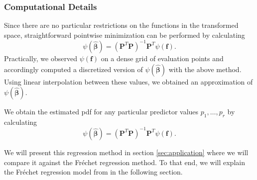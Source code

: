 \subsubsection{Computational Details}
\label{sec:com_details_func_reg}
Since there are no particular restrictions on the functions in the transformed space,
straightforward pointwise minimization can be performed by calculating
\begin{equation}
    \psi(\hat{\boldsymbol{\beta}})
    = \left(\mathbf{P}^T \mathbf{P}\right)^{-1} \mathbf{P}^T \psi(\mathbf{f}).
\end{equation}
Practically, we observed $\psi(\mathbf{f})$ on a dense grid of evaluation points and
accordingly computed a discretized version of $\psi(\hat{\boldsymbol{\beta}})$ with the
above method. Using linear interpolation between these values, we obtained an approximation
of $\psi(\hat{\boldsymbol{\beta}})$.

We obtain the estimated pdf for any particular predictor values $p_1, \dots, p_r$ by
calculating
\begin{equation}
    \psi(\hat{\boldsymbol{\beta}})
    = \left(\mathbf{P}^T \mathbf{P}\right)^{-1} \mathbf{P}^T \psi(\mathbf{f}).
\end{equation}

We will present this regression method in section \ref{sec:application} where we will
compare it against the Fréchet regression method. To that end, we will explain the
Fréchet regression model from \textcite{PetersenMüller2019} in the following section.
